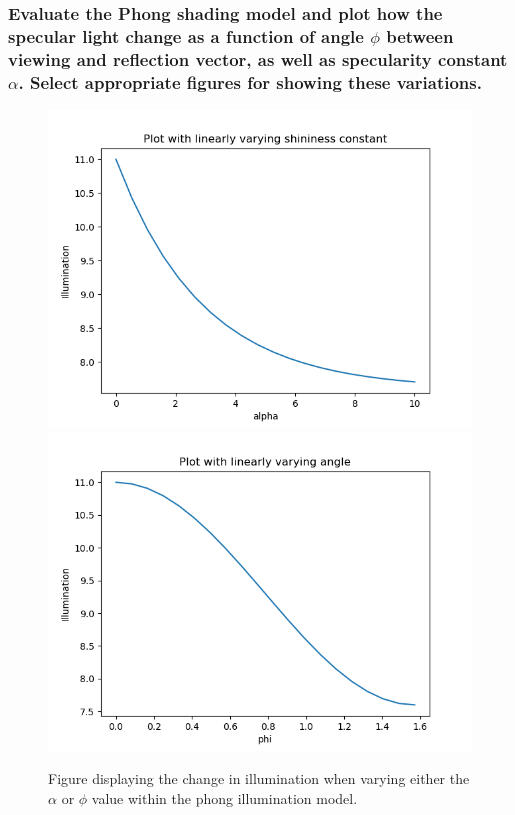 \documentclass[a4paper, titlepage,12pt]{article}
\begin{document}
	\subsubsection*{Evaluate the Phong shading model and plot how the specular light change as a function of angle $\phi$ between viewing and reflection vector, as well as specularity constant $\alpha$. Select appropriate figures for showing these variations.}

	\begin{figure}[H]
		\begin{center}
			\includegraphics[scale=0.4]{./alpha_plot.png}
			\includegraphics[scale=0.4]{./phi_plot.png}
			\caption{Figure displaying the change in illumination when varying either the $\alpha$ or $\phi$ value within the phong illumination model.}
		\end{center}
	\end{figure}
\end{document}
